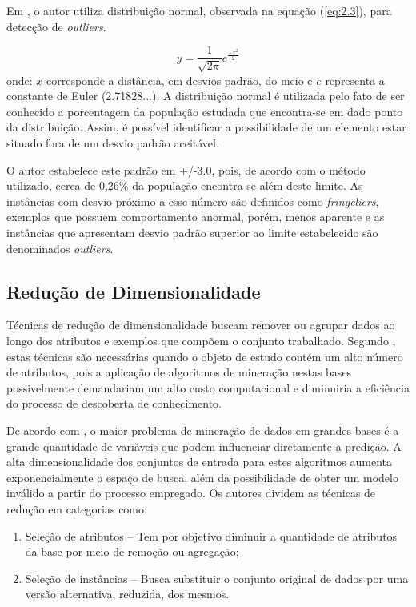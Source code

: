Em , o autor utiliza distribuição normal, observada na equação (\ref{eq:2.3}), para detecção de \textit{outliers}.

\begin{equation}
    y = \frac{1}{\sqrt{2\pi}}{e^{\frac{-x^{2}}{2}}}
    \label{eq:2.3}
\end{equation}
onde: $x$ corresponde a distância, em desvios padrão, do meio e $e$ representa a constante de Euler (2.71828...). A distribuição normal é utilizada pelo fato de ser conhecido a porcentagem da população estudada que encontra-se em dado ponto da distribuição. Assim, é possível identificar a possibilidade de um elemento estar situado fora de um desvio padrão aceitável.

O autor estabelece este padrão em +/-3.0, pois, de acordo com o método utilizado, cerca de 0,26\% da população encontra-se além deste limite. As instâncias com desvio próximo a esse número são definidos como \textit{fringeliers}, exemplos que possuem comportamento anormal, porém, menos aparente e as instâncias que apresentam desvio padrão superior ao limite estabelecido são denominados \textit{outliers}.

\subsection{Redução de Dimensionalidade}
\label{subsec:data-reduction}

Técnicas de redução de dimensionalidade buscam remover ou agrupar dados ao longo dos atributos e exemplos que compõem o conjunto trabalhado. Segundo , estas técnicas são necessárias quando o objeto de estudo contém um alto número de atributos, pois a aplicação de algoritmos de mineração nestas bases possivelmente demandariam um alto custo computacional e diminuiria a eficiência do processo de descoberta de conhecimento.

De acordo com , o maior problema de mineração de dados em grandes bases é a grande quantidade de variáveis que podem influenciar diretamente a predição. A alta dimensionalidade dos conjuntos de entrada para estes algoritmos aumenta exponencialmente o espaço de busca, além da possibilidade de obter um modelo inválido a partir do processo empregado. Os autores dividem as técnicas de redução em categorias como:

\begin{enumerate}[label=\roman*.]
    \item Seleção de atributos {--} Tem por objetivo diminuir a quantidade de atributos da base por meio de remoção ou agregação;
    \item Seleção de instâncias {--} Busca substituir o conjunto original de dados por uma versão alternativa, reduzida, dos mesmos.
\end{enumerate}

